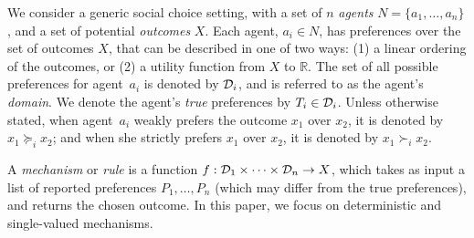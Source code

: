 We consider a generic social choice setting, with a set of $n$ \emph{agents} $N = \{a_1, \ldots, a_n\}$, and a set of potential \emph{outcomes} $X$.
%
%
Each agent, $a_i \in N$, has preferences over the set of outcomes $X$, that can be described in one of two ways: (1) a linear ordering of the outcomes, or (2) a utility function from $X$ to $\mathbb{R}$.
%
The set of all possible preferences for agent~$a_i$ is denoted by $\mathcal{D}_i$, and is referred to as the agent's \emph{domain}. 
We denote the agent's \emph{true} preferences by $T_i \in \mathcal{D}_i$.
%
Unless otherwise stated, when agent~$a_i$ weakly prefers the outcome $x_1$ over $x_2$, it is denoted by $x_1 \succeq_i x_2$; and when she strictly prefers $x_1$ over $x_2$, it is denoted by $x_1 \succ_i x_2$.



A \emph{mechanism} or \emph{rule}  is a function $f: \mathcal{D}_1\times\cdots \times \mathcal{D}_n \to X$, which takes as input a list of reported preferences $P_1,\ldots,P_n$ (which may differ from the true preferences), and returns the chosen outcome.
In this paper, we focus on deterministic and single-valued mechanisms. 

